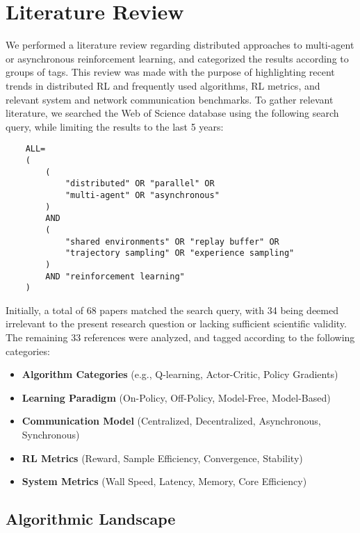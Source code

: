 \chapter{Literature Review}
\label{ch:literature_review}

We performed a literature review regarding distributed approaches to multi-agent or asynchronous reinforcement learning,
and categorized the results according to groups of tags.
This review was made with the purpose of highlighting recent trends in distributed RL and frequently used algorithms, RL metrics,
and relevant system and network communication benchmarks.
To gather relevant literature, we searched the Web of Science database using the following search query,
while limiting the results to the last 5 years:

\begin{verbatim}
    ALL=
    (
        (
            "distributed" OR "parallel" OR
            "multi-agent" OR "asynchronous"
        )
        AND
        (
            "shared environments" OR "replay buffer" OR
            "trajectory sampling" OR "experience sampling"
        )
        AND "reinforcement learning"
    )
\end{verbatim}

Initially, a total of 68 papers matched the search query, with 34 being deemed irrelevant to the
present research question or lacking sufficient scientific validity.
The remaining 33 references were analyzed, and tagged according to the following categories:

\begin{itemize}[leftmargin=*, label={--}]
    \item \textbf{Algorithm Categories} (e.g., Q-learning, Actor-Critic, Policy Gradients)
    \item \textbf{Learning Paradigm} (On-Policy, Off-Policy, Model-Free, Model-Based)
    \item \textbf{Communication Model} (Centralized, Decentralized, Asynchronous, Synchronous)
    \item \textbf{RL Metrics} (Reward, Sample Efficiency, Convergence, Stability)
    \item \textbf{System Metrics} (Wall Speed, Latency, Memory, Core Efficiency)
\end{itemize}

\section{Algorithmic Landscape}
\label{sec:algorithmic-landscape}

